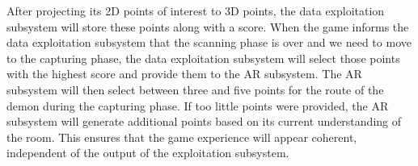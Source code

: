 After projecting its 2D points of interest to 3D points, the data exploitation subsystem will store these points along with a score.
When the game informs the data exploitation subsystem that the scanning phase is over and we need to move to the capturing phase, the data exploitation subsystem will select those points with the highest score and provide them to the AR subsystem.
The AR subsystem will then select between three and five points for the route of the demon during the capturing phase.
If too little points were provided, the AR subsystem will generate additional points based on its current understanding of the room.
This ensures that the game experience will appear coherent, independent of the output of the exploitation subsystem.
